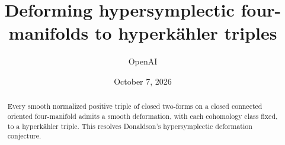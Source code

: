 \documentclass[11pt]{amsart}
\title[Deforming hypersymplectic four-manifolds]{Deforming hypersymplectic four-manifolds to hyperk\"ahler triples}
\author{OpenAI}
\date{October 7, 2026}
\begin{document}
\begin{abstract}
Every smooth normalized positive triple of closed two-forms on a closed
connected oriented four-manifold admits a smooth deformation, with each
cohomology class fixed, to a hyperk\"ahler triple.
This resolves Donaldson's hypersymplectic deformation conjecture.
\end{abstract}
\maketitle

\tableofcontents












\end{document}
